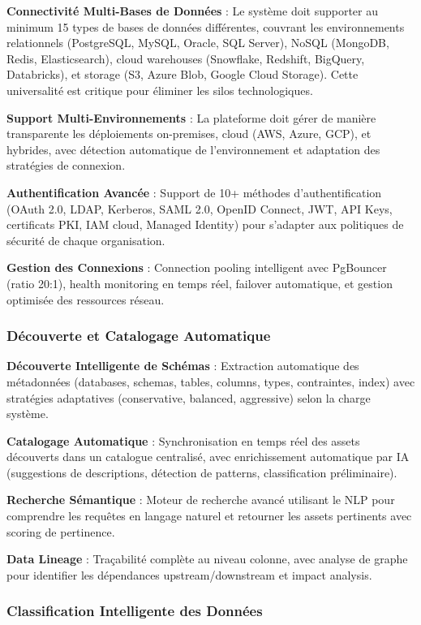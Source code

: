 \textbf{Connectivité Multi-Bases de Données} : Le système doit supporter au minimum 15 types de bases de données différentes, couvrant les environnements relationnels (PostgreSQL, MySQL, Oracle, SQL Server), NoSQL (MongoDB, Redis, Elasticsearch), cloud warehouses (Snowflake, Redshift, BigQuery, Databricks), et storage (S3, Azure Blob, Google Cloud Storage). Cette universalité est critique pour éliminer les silos technologiques.

\textbf{Support Multi-Environnements} : La plateforme doit gérer de manière transparente les déploiements on-premises, cloud (AWS, Azure, GCP), et hybrides, avec détection automatique de l'environnement et adaptation des stratégies de connexion.

\textbf{Authentification Avancée} : Support de 10+ méthodes d'authentification (OAuth 2.0, LDAP, Kerberos, SAML 2.0, OpenID Connect, JWT, API Keys, certificats PKI, IAM cloud, Managed Identity) pour s'adapter aux politiques de sécurité de chaque organisation.

\textbf{Gestion des Connexions} : Connection pooling intelligent avec PgBouncer (ratio 20:1), health monitoring en temps réel, failover automatique, et gestion optimisée des ressources réseau.

\subsubsection{Découverte et Catalogage Automatique}

\textbf{Découverte Intelligente de Schémas} : Extraction automatique des métadonnées (databases, schemas, tables, columns, types, contraintes, index) avec stratégies adaptatives (conservative, balanced, aggressive) selon la charge système.

\textbf{Catalogage Automatique} : Synchronisation en temps réel des assets découverts dans un catalogue centralisé, avec enrichissement automatique par IA (suggestions de descriptions, détection de patterns, classification préliminaire).

\textbf{Recherche Sémantique} : Moteur de recherche avancé utilisant le NLP pour comprendre les requêtes en langage naturel et retourner les assets pertinents avec scoring de pertinence.

\textbf{Data Lineage} : Traçabilité complète au niveau colonne, avec analyse de graphe pour identifier les dépendances upstream/downstream et impact analysis.

\subsubsection{Classification Intelligente des Données}

